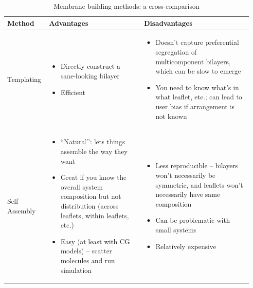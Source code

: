 \documentclass[9pt,bestpractices]{livecoms}
\begin{document}
\begin{table}[t]
\centering
\caption{Membrane building methods: a cross-comparison}
\label{tab:buildmtds}
\begin{tabularx}{\linewidth}{| l | X | X |}
\hline
\textbf{Method} & \textbf{Advantages} & \textbf{Disadvantages} \\
\hline
Templating & \begin{minipage}[t]{\linewidth} \begin{itemize}[nosep,after=\strut] \item Directly construct a sane-looking bilayer \item Efficient \end{itemize} \end{minipage} & \begin{minipage}[t]{\linewidth} \begin{itemize}[nosep,after=\strut] \item Doesn't capture preferential segregation of multicomponent bilayers, which can be slow to emerge \item You need to know what's in what leaflet, etc.; can lead to user bias if arrangement is not known \end{itemize} \end{minipage} \\
\hline
Self-Assembly & \begin{minipage}[t]{\linewidth} \begin{itemize}[nosep,after=\strut] \item ``Natural'': lets things assemble the way they want \item Great if you know the overall system composition but not distribution (across leaflets, within leaflets, etc.) \item Easy (at least with CG models) -- scatter molecules and run simulation \end{itemize} \end{minipage} & \begin{minipage}[t]{\linewidth} \begin{itemize}[nosep,after=\strut] \item Less reproducible -- bilayers won't necessarily be symmetric, and leaflets won't necessarily have same composition \item Can be problematic with small systems \item Relatively expensive \end{itemize} \end{minipage} \\
\hline
\end{tabularx}
\end{table}
\end{document}

